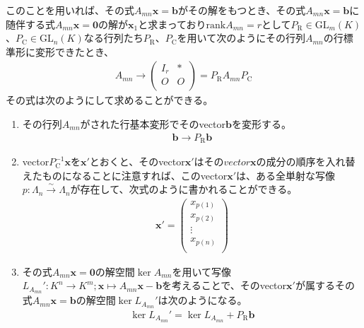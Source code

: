 \documentclass[dvipdfmx]{jsarticle}
\begin{document}
\begin{thm}\label{2.1.8.8}
このことを用いれば、その式$A_{mn}\mathbf{x} = \mathbf{b}$がその解をもつとき、その式$A_{mn}\mathbf{x} = \mathbf{b}$に随伴する式$A_{mn}\mathbf{x} = \mathbf{0}$の解が$\mathbf{x}_{1}$と求まっており${\mathrm{rank}}A_{mn} = r$として$P_{\mathrm{R}} \in {\mathrm{GL}}_{m}(K)$、$P_{\mathrm{C}} \in {\mathrm{GL}}_{n}(K)$なる行列たち$P_{\mathrm{R}}$、$P_{\mathrm{C}}$を用いて次のようにその行列$A_{mn}$の行標準形に変形できたとき、
\begin{align*}
A_{mn} \rightarrow \begin{pmatrix}
I_{r} & * \\
O & O \\
\end{pmatrix} = P_{\mathrm{R}}A_{mn}P_{\mathrm{C}}
\end{align*}
その式は次のようにして求めることができる。
\begin{enumerate}
\item
  その行列$A_{mn}$がされた行基本変形でそのvector$\mathbf{b}$を変形する。
\begin{align*}
\mathbf{b} \rightarrow P_{\mathrm{R}}\mathbf{b}
\end{align*}
\item
  vector$P_{\mathrm{C}}^{- 1}\mathbf{x}$を$\mathbf{x}'$とおくと、そのvector$\mathbf{x}'はそのvector\mathbf{x}$の成分の順序を入れ替えたものになることに注意すれば、このvector$\mathbf{x}'$は、ある全単射な写像$p:\varLambda_{n}\overset{\sim}{\rightarrow}\varLambda_{n}$が存在して、次式のように書かれることができる。
\begin{align*}
\mathbf{x}' = \begin{pmatrix}
x_{p(1)} \\
x_{p(2)} \\
 \vdots \\
x_{p(n)} \\
\end{pmatrix}
\end{align*}
\item
  その式$A_{mn}\mathbf{x} = \mathbf{0}$の解空間$\ker A_{mn}$を用いて写像$L_{A_{mn}}':K^{n} \rightarrow K^{m};\mathbf{x} \mapsto A_{mn}\mathbf{x} - \mathbf{b}$を考えることで、そのvector$\mathbf{x}'$が属するその式$A_{mn}\mathbf{x} = \mathbf{b}$の解空間$\ker L_{A_{mn}}'$は次のようになる。
\begin{align*}
\ker L_{A_{mn}}' = \ker L_{A_{mn}} + P_{\mathrm{R}}\mathbf{b}
\end{align*}
\end{enumerate}
\end{thm}\par
\end{document}
